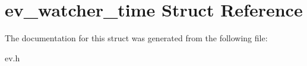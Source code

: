 \hypertarget{structev__watcher__time}{}\section{ev\+\_\+watcher\+\_\+time Struct Reference}
\label{structev__watcher__time}


The documentation for this struct was generated from the following file\+:\begin{DoxyCompactItemize}
\item 
ev.\+h\end{DoxyCompactItemize}
